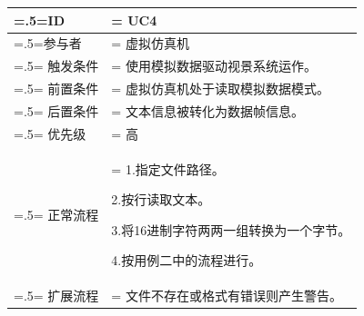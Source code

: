 {\begin{table}[htbp]
\begin{center}
        \begin{tabularx}{0.8\textwidth}{ 
            | >{\centering\arraybackslash\hsize=.5\hsize\linewidth=\hsize}X 
            | >{\raggedright\arraybackslash\hsize=1.5\hsize\linewidth=\hsize}X 
            | }
            \hline
            \textbf{ID} & \textbf{UC4}\\
            \hline
            参与者 & 虚拟仿真机\\
            \hline
            触发条件 & 使用模拟数据驱动视景系统运作。\\
            \hline
            前置条件 & 虚拟仿真机处于读取模拟数据模式。\\
            \hline
            后置条件 & 文本信息被转化为数据帧信息。\\
            \hline
            优先级 & 高\\
            \hline
            正常流程 & 1.指定文件路径。\par 2.按行读取文本。\par 3.将16进制字符两两一组转换为一个字节。\par 4.按用例二中的流程进行。\\
            \hline
            扩展流程 & 文件不存在或格式有错误则产生警告。\\
            \hline
        \end{tabularx}
    \end{center}
\end{table}

}
